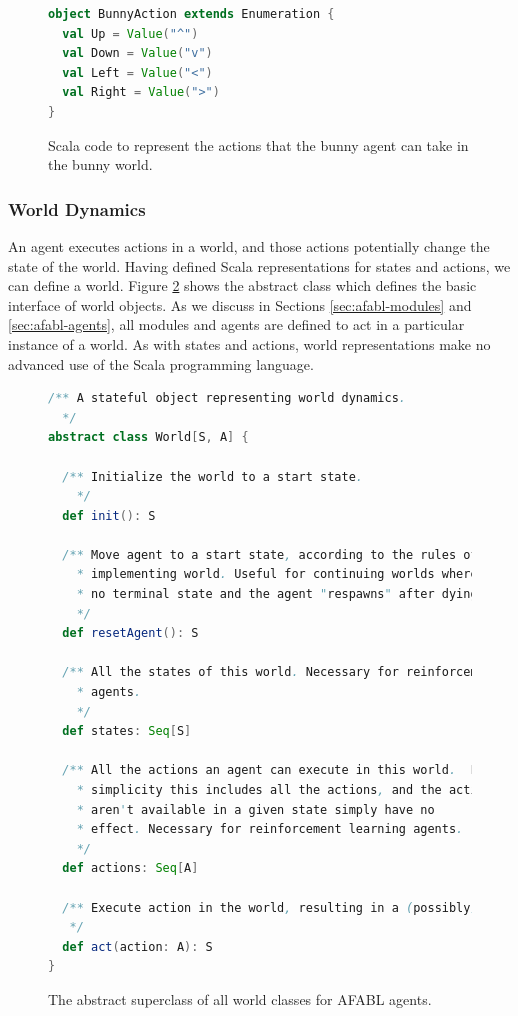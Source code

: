 \begin{figure}[ht]
\begin{center}

\begin{lstlisting}[language=Scala]
object BunnyAction extends Enumeration {
  val Up = Value("^")
  val Down = Value("v")
  val Left = Value("<")
  val Right = Value(">")
}
\end{lstlisting}

\caption{Scala code to represent the actions that the bunny agent can take in the bunny world.}
\end{center}
\label{fig:bunny-action-code}
\end{figure}

\subsubsection{World Dynamics}

An agent executes actions in a world, and those actions potentially change the state of the world. Having defined Scala representations for states and actions, we can define a world. Figure \ref{fig:world-code} shows the abstract class which defines the basic interface of world objects. As we discuss in Sections \ref{sec:afabl-modules} and \ref{sec:afabl-agents}, all modules and agents are defined to act in a particular instance of a world. As with states and actions, world representations make no advanced use of the Scala programming language.

\begin{figure}[ht]
\begin{center}

\begin{lstlisting}[language=Scala]
/** A stateful object representing world dynamics.
  */
abstract class World[S, A] {

  /** Initialize the world to a start state.
    */
  def init(): S

  /** Move agent to a start state, according to the rules of the
    * implementing world. Useful for continuing worlds where there is
    * no terminal state and the agent "respawns" after dying.
    */
  def resetAgent(): S

  /** All the states of this world. Necessary for reinforcement learning
    * agents.
    */
  def states: Seq[S]

  /** All the actions an agent can execute in this world.  For
    * simplicity this includes all the actions, and the actions that
    * aren't available in a given state simply have no
    * effect. Necessary for reinforcement learning agents.
    */
  def actions: Seq[A]

  /** Execute action in the world, resulting in a (possibly) new state.
   */
  def act(action: A): S
}
\end{lstlisting}
\caption{The abstract superclass of all world classes for AFABL agents.}
\end{center}
\label{fig:world-code}
\end{figure}


